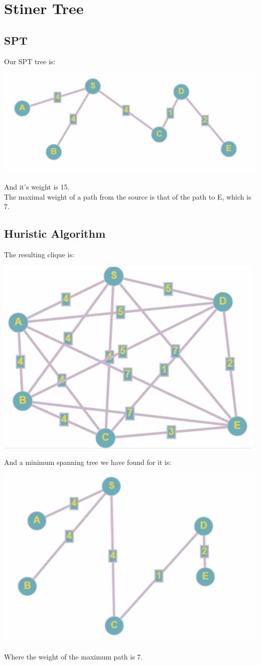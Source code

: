 \section{Stiner Tree}
\subsection{SPT}
Our SPT tree is:
\begin{center}
    \includegraphics[width=0.6 \textwidth]{resources/q3-1.png}\centering
\end{center}
And it's weight is 15.\\
The maximal weight of a path from the source is that of the path to E,
which is 7.

\subsection{Huristic Algorithm}
The resulting clique is:
\begin{center}
    \includegraphics[width=0.6 \textwidth]{resources/q3-3.png}\centering
\end{center}
And a minimum spanning tree we have found for it is:
\begin{center}
    \includegraphics[width=0.6 \textwidth]{resources/q3-4.png}\centering
\end{center}
Where the weight of the maximum path is 7. 

